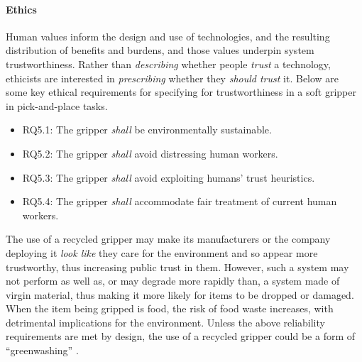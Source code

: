 \documentclass[lettersize,journal]{IEEEtran}
\begin{document}

\paragraph{Ethics}\label{ethics}
Human values inform the design and use of technologies, and the resulting distribution of benefits and burdens, and those values underpin system trustworthiness. Rather than \emph{describing} whether people \emph{trust} a technology, ethicists are interested in \emph{prescribing} whether they \emph{should trust} it. Below are some key ethical requirements for specifying for trustworthiness in a soft gripper in pick-and-place tasks.
\begin{itemize}
	\item RQ5.1: The gripper \emph{shall} 
        be environmentally sustainable. 
        \item RQ5.2: The gripper \emph{shall} avoid distressing human workers.
        \item RQ5.3: The gripper \emph{shall} avoid exploiting humans’ trust heuristics.
        \item RQ5.4: The gripper \emph{shall} accommodate fair treatment of current human workers.
\end{itemize}

The use of a recycled gripper may make its manufacturers or the company deploying it \emph{look like} they care for the environment and so appear more trustworthy, thus increasing public trust in them. However, such a system may not perform as well as, or may degrade more rapidly than, a system made of virgin material, thus making it more likely for items to be dropped or damaged. When the item being gripped is food, the risk of food waste increases, with detrimental implications for the environment. Unless the above reliability requirements are met by design, the use of a recycled gripper could be a form of “greenwashing” \cite{delmas2011drivers}.    
\end{document}
